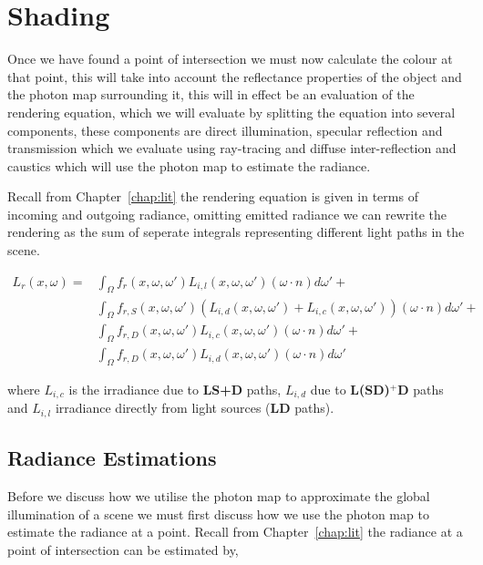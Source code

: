 \section{Shading}
Once we have found a point of intersection we must now calculate the colour at that point, this will take into account the
reflectance properties of the object and the photon map surrounding it, this will in effect be an evaluation of the rendering
equation, which we will evaluate by splitting the equation into several components, these components are direct illumination,
specular reflection and transmission which we evaluate using ray-tracing and diffuse inter-reflection and caustics which will
use the photon map to estimate the radiance.

Recall from Chapter~\ref{chap:lit}  the rendering equation is given in terms of incoming and outgoing radiance, omitting
emitted radiance we can rewrite the rendering as the sum of seperate integrals representing different light paths in the scene. \cite{JensenBook}

\begin{align*}
L_{r}(x, \omega) =&
			\int_{\Omega}
				f_{r}(x, \omega, \omega')
				L_{i,l}(x,\omega,\omega')
				(\omega \cdot n)d\omega'
			+\\
		&	\int_{\Omega}
				f_{r,S}(x, \omega, \omega')
				(
				L_{i,d}(x,\omega,\omega')
				+
				L_{i,c}(x,\omega,\omega')
				)
				(\omega \cdot n)d\omega'
			+\\
		&	\int_{\Omega}
				f_{r,D}(x, \omega, \omega')
				L_{i,c}(x,\omega,\omega')
				(\omega \cdot n)d\omega'
			+\\
		&	\int_{\Omega}
				f_{r,D}(x, \omega, \omega')
				L_{i,d}(x,\omega,\omega')
				(\omega \cdot n)d\omega'
\end{align*}

where $L_{i,c}$ is the irradiance due to \textbf{LS+D} paths, $L_{i,d}$ due to \textbf{L(S\textbar D)$^+$D} paths and $L_{i,l}$
irradiance directly from light sources (\textbf{LD} paths).

\subsection{Radiance Estimations}
Before we discuss how we utilise the photon map to approximate the global illumination of a scene we must first discuss how
we use the photon map to estimate the radiance at a point. Recall from Chapter~\ref{chap:lit} the radiance at a point
of intersection can be estimated by,

